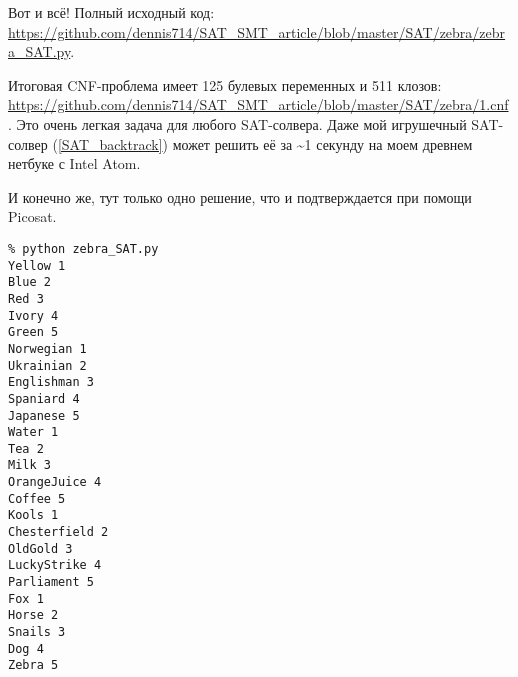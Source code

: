 Вот и всё!
Полный исходный код: \url{https://github.com/dennis714/SAT_SMT_article/blob/master/SAT/zebra/zebra_SAT.py}.

Итоговая CNF-проблема имеет 125 булевых переменных и 511 клозов: \\
\url{https://github.com/dennis714/SAT_SMT_article/blob/master/SAT/zebra/1.cnf}.
Это очень легкая задача для любого SAT-солвера.
Даже мой игрушечный SAT-солвер (\ref{SAT_backtrack}) может решить её за \textasciitilde{}1 секунду на моем древнем
нетбуке с Intel Atom.

И конечно же, тут только одно решение, что и подтверждается при помощи Picosat.

\begin{lstlisting}
% python zebra_SAT.py
Yellow 1
Blue 2
Red 3
Ivory 4
Green 5
Norwegian 1
Ukrainian 2
Englishman 3
Spaniard 4
Japanese 5
Water 1
Tea 2
Milk 3
OrangeJuice 4
Coffee 5
Kools 1
Chesterfield 2
OldGold 3
LuckyStrike 4
Parliament 5
Fox 1
Horse 2
Snails 3
Dog 4
Zebra 5
\end{lstlisting}

